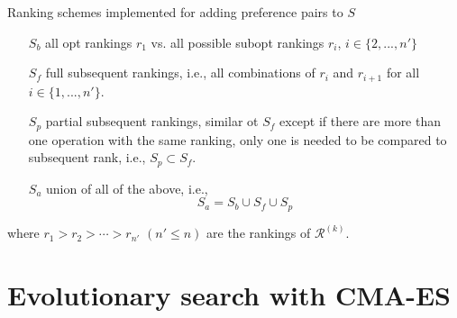 \documentclass[xcolor=pdftex,t,11pt,handout]{beamer}
\begin{document}
{	\framebreak 
	\begin{block}{Ranking schemes implemented for adding preference pairs to $S$}
	\begin{itemize}
		\item[$S_{b}$] all opt rankings $r_1$ vs. all possible subopt rankings $r_i$, $i\in\{2,...,n'\}$
		\item[$S_{f}$] full subsequent rankings, i.e., all combinations of $r_i$ and $r_{i+1}$ for all $i\in\{1,...,n'\}$. 
		\item[$S_{p}$] partial subsequent rankings, similar ot $S_f$ except if there are more than one operation with the same ranking, only one is needed to be compared to subsequent rank, i.e., $S_p\subset S_f$.
		\item[$S_{a}$] union of all of the above, i.e., 
		$$ S_{a} = S_b \cup S_f \cup S_p$$
	\end{itemize}
	where $r_1>r_2>\cdots>r_{n'}$ $(n'\leq n)$ are the rankings of $\mathcal{R}^{(k)}$.
	\end{block}
}








\section{Evolutionary search with CMA-ES}
\frame{\tableofcontents[currentsection]}
\end{document}

